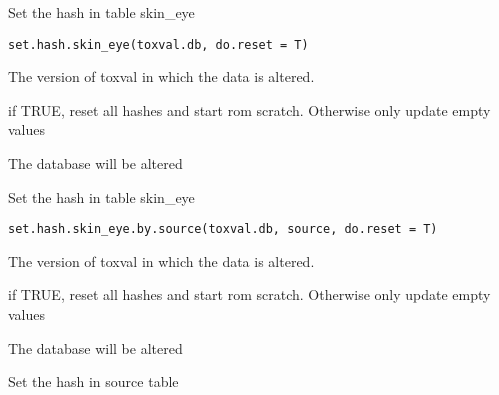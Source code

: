 \documentclass[letterpaper]{book}
\begin{document}
%
\begin{Description}\relax
Set the hash in table skin\_eye
\end{Description}
%
\begin{Usage}
\begin{verbatim}
set.hash.skin_eye(toxval.db, do.reset = T)
\end{verbatim}
\end{Usage}
%
\begin{Arguments}
\begin{ldescription}
\item[\code{toxval.db}] The version of toxval in which the data is altered.

\item[\code{do.reset}] if TRUE, reset all hashes and start rom scratch.
Otherwise only update empty values
\end{ldescription}
\end{Arguments}
%
\begin{Value}
The database will be altered
\end{Value}
%
\begin{Description}\relax
Set the hash in table skin\_eye
\end{Description}
%
\begin{Usage}
\begin{verbatim}
set.hash.skin_eye.by.source(toxval.db, source, do.reset = T)
\end{verbatim}
\end{Usage}
%
\begin{Arguments}
\begin{ldescription}
\item[\code{toxval.db}] The version of toxval in which the data is altered.

\item[\code{do.reset}] if TRUE, reset all hashes and start rom scratch.
Otherwise only update empty values
\end{ldescription}
\end{Arguments}
%
\begin{Value}
The database will be altered
\end{Value}
%
\begin{Description}\relax
Set the hash in source table
\end{Description}
\end{document}
